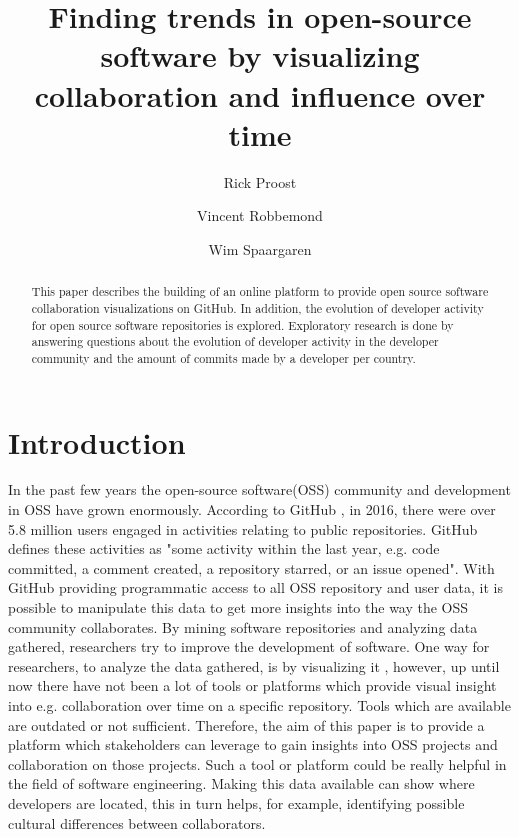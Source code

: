 \documentclass[acmtog, authorversion]{acmart}
\begin{document}
\title{Finding trends in open-source software by visualizing collaboration and influence over time} 

\author{Rick Proost}

\author{Vincent Robbemond}

\author{Wim Spaargaren}

\begin{abstract}
This paper describes the building of an online platform to provide open source software collaboration visualizations on GitHub.
In addition, the evolution of developer activity for open source software repositories is explored.
Exploratory research is done by answering questions about the evolution of developer activity in the developer community and the amount of commits made by a developer per country.
\end{abstract}


\maketitle

\section{Introduction}
In the past few years the open-source software(OSS) community and development in OSS have grown enormously.
According to GitHub \cite{GHOctoverse}, in 2016, there were over 5.8 million users engaged in activities relating to public repositories.
GitHub defines these activities as "some activity within the last year, e.g. code committed, a comment created, a repository starred, or an issue opened".
With GitHub providing programmatic access to all OSS repository and user data\cite{GHAPI}, it is possible to manipulate this data to get more insights into the way the OSS community collaborates.
By mining software repositories and analyzing data gathered, researchers try to improve the development of software. 
One way for researchers, to analyze the data gathered, is by visualizing it \cite{Heller}, however, up until now there have not been a lot of tools or platforms which provide visual insight into e.g. collaboration over time on a specific repository.
Tools which are available are outdated or not sufficient.
Therefore, the aim of this paper is to provide a platform which stakeholders can leverage to gain insights into OSS projects and collaboration on those projects.
Such a tool or platform could be really helpful in the field of software engineering. 
Making this data available can show where developers are located, this in turn helps, for example, identifying possible cultural differences between collaborators. 
\end{document}
